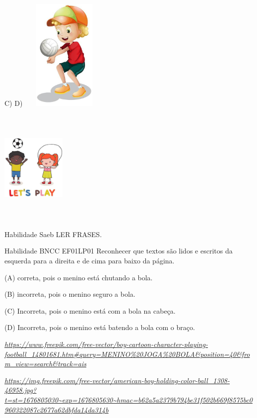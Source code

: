 \begin{escola}
C) D)
\includegraphics[width=1.65208in,height=2.13056in]{media/image201.jpg}

\includegraphics[width=1.21736in,height=2.20972in]{media/image202.jpg}

Habilidade Saeb LER FRASES.

Habilidade BNCC EF01LP01 Reconhecer que textos são lidos e escritos da
esquerda para a direita e de cima para baixo da página.

(A) correta, pois o menino está chutando a bola.

(B) incorreta, pois o menino seguro a bola.

(C) Incorreta, pois o menino está com a bola na cabeça.

(D) Incorreta, pois o menino está batendo a bola com o braço.

\href{https://www.freepik.com/free-vector/boy-cartoon-character-playing-football_14801681.htm\#query=MENINO\%20JOGA\%20BOLA\&position=40\&from_view=search\&track=ais}{\emph{https://www.freepik.com/free-vector/boy-cartoon-character-playing-football\_14801681.htm\#query=MENINO\%20JOGA\%20BOLA\&position=40\&from\_view=search\&track=ais}}

\href{https://img.freepik.com/free-vector/american-boy-holding-color-ball_1308-46958.jpg?t=st=1676805030~exp=1676805630~hmac=b62a5a2379b794be31f502b669f8575bc0960322087c2677a62dbfda14da314b}{\emph{https://img.freepik.com/free-vector/american-boy-holding-color-ball\_1308-46958.jpg?t=st=1676805030\textasciitilde{}exp=1676805630\textasciitilde{}hmac=b62a5a2379b794be31f502b669f8575bc0960322087c2677a62dbfda14da314b}}


\end{escola}
